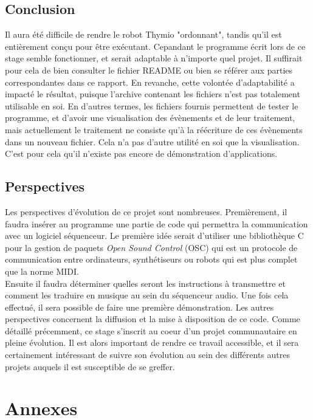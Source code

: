 \documentclass[a4paper, 12pt]{report}
\begin{document}
\section{Conclusion}
Il aura été difficile de rendre le robot Thymio "ordonnant", tandis qu'il est entièrement conçu pour être exécutant. Cepandant le programme écrit lors de ce stage semble fonctionner, et serait adaptable à n'importe quel projet. Il suffirait pour cela de bien consulter le fichier README ou bien se référer aux parties correspondantes dans ce rapport. En revanche, cette volontée d'adaptabilité a impacté le résultat, puisque l'archive contenant les fichiers n'est pas totalement utilisable en soi. En d'autres termes, les fichiers fournis permettent de tester le programme, et d'avoir une visualisation des évènements et de leur traitement, mais actuellement le traitement ne consiste qu'à la réécriture de ces évènements dans un nouveau fichier. Cela n'a pas d'autre utilité en soi que la visualisation. C'est pour cela qu'il n'existe pas encore de démonstration d'applications.

\section{Perspectives}
Les perspectives d'évolution de ce projet sont nombreuses. Premièrement, il faudra insérer au programme une partie de code qui permettra la communication avec un logiciel séquenceur. Le première idée serait d'utiliser une bibliothèque C pour la gestion de paquets \textit{Open Sound Control} (OSC) qui est un protocole de communication entre ordinateurs, synthétiseurs ou robots qui est plus complet que la norme MIDI.\\
Ensuite il faudra déterminer quelles seront les instructions à transmettre et comment les traduire en musique au sein du séquenceur audio. Une fois cela effectué, il sera possible de faire une première démonstration.
Les autres perspectives concernent la diffusion et la mise à disposition de ce code. Comme détaillé précemment, ce stage s'inscrit au coeur d'un projet communautaire en pleine évolution. Il est alors important de rendre ce travail accessible, et il sera certainement intéressant de suivre son évolution au sein des différents autres projets auquels il est susceptible de se greffer.


\nocite{*}

\chapter*{Annexes}
\end{document}
